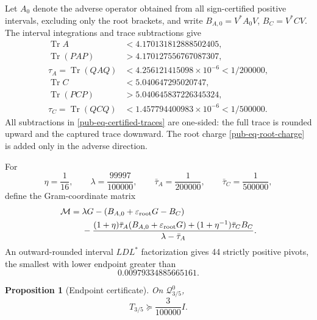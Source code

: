 \documentclass[11pt]{article}
\newtheorem{proposition}[theorem]{Proposition}
\theoremstyle{remark}
\DeclareMathOperator{\Tr}{Tr}
\begin{document}
Let \(A_0\) denote the adverse operator obtained from all sign-certified positive intervals,
excluding only the root brackets, and write \(B_{A,0}=V^*A_0V\), \(B_C=V^*CV\).
The interval integrations and trace subtractions give
\begin{equation}
\begin{aligned}
 \Tr A&<4.170131812888502405,\\
 \Tr(PAP)&>4.170127556767087307,\\
 \tau_A=\Tr(QAQ)
   &<4.256121415098\times10^{-6}<1/200000,\\[1mm]
 \Tr C&<5.040647295020747,\\
 \Tr(PCP)&>5.040645837226345324,\\
 \tau_C=\Tr(QCQ)
   &<1.457794400983\times10^{-6}<1/500000.
\end{aligned}
\label{pub-eq-certified-traces}
\end{equation}
All subtractions in \eqref{pub-eq-certified-traces} are one-sided:
the full trace is rounded upward and the captured trace downward.
The root charge \eqref{pub-eq-root-charge} is added only in the adverse direction.

For
\begin{equation}
 \eta=\frac1{16},
 \qquad
 \lambda=\frac{99997}{100000},
 \qquad
 \bar\tau_A=\frac1{200000},
 \qquad
 \bar\tau_C=\frac1{500000},
\label{pub-eq-lmi-rationals}
\end{equation}
define the Gram-coordinate matrix
\begin{align}
 \mathcal M={}&
 \lambda G-(B_{A,0}+\varepsilon_{\mathrm{root}}G-B_C)
 \notag\\
 &-\frac{
 (1+\eta)\bar\tau_A(B_{A,0}+\varepsilon_{\mathrm{root}}G)
 +(1+\eta^{-1})\bar\tau_CB_C}
 {\lambda-\bar\tau_A}.
\label{pub-eq-final-lmi}
\end{align}
An outward-rounded interval \(LDL^*\) factorization gives 44 strictly positive pivots,
the smallest with lower endpoint greater than
\begin{equation}
                  0.00979334885665161.
\label{pub-eq-final-pivot}
\end{equation}

\begin{proposition}[Endpoint certificate]
\label{pub-prop-endpoint-certificate}
On \(\mathcal Q_{3/5}^0\),
\begin{equation}
                 T_{3/5}\succeq\frac3{100000}I.
\label{pub-eq-endpoint-bound}
\end{equation}
\end{proposition}
\end{document}
